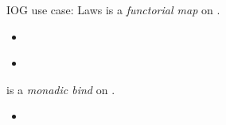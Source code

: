 \documentclass[aspectratio=169]{beamer}
\begin{document}
\begin{frame}[fragile]{IOG use case: Laws}
 is a \textit{functorial map} on .
\begin{itemize}
\item \begin{code}[inline]%
\>[0]%
\>[10]\AgdaSymbol{:}\AgdaSpace{}%
\AgdaSymbol{(}\AgdaSpace{}%
\AgdaSymbol{:}\AgdaSpace{}%
\AgdaSpace{}%
\AgdaSymbol{)}\AgdaSpace{}%
\AgdaSpace{}%
\AgdaSpace{}%
\AgdaSpace{}%
\AgdaSpace{}%
\AgdaSpace{}%
\<%
\end{code}
\item \begin{code}[inline]%
\>[0]%
\>[10]\AgdaSymbol{:}\AgdaSpace{}%
\AgdaSymbol{(}\AgdaSpace{}%
\AgdaSymbol{:}\AgdaSpace{}%
\AgdaSpace{}%
\AgdaSymbol{)}\AgdaSpace{}%
\AgdaSymbol{(}\AgdaSpace{}%
\AgdaSymbol{:}\AgdaSpace{}%
\AgdaSpace{}%
\AgdaSpace{}%
%
\>[39]\AgdaSymbol{)}\AgdaSpace{}%
\AgdaSymbol{(}\AgdaSpace{}%
\AgdaSymbol{:}\AgdaSpace{}%
\AgdaSpace{}%
\AgdaSpace{}%
\AgdaSpace{}%
\AgdaSymbol{)}\<%
\\
%
\>[10]\AgdaSpace{}%
\AgdaSpace{}%
\AgdaSymbol{(}\AgdaSpace{}%
\AgdaSpace{}%
\AgdaSymbol{)}\AgdaSpace{}%
\AgdaSpace{}%
\AgdaSpace{}%
\AgdaSpace{}%
\AgdaSpace{}%
\AgdaSymbol{(}\AgdaSpace{}%
\AgdaSpace{}%
\AgdaSymbol{)}\<%
\end{code}
\end{itemize}
\pause
{} is a \textit{monadic bind} on .
\begin{itemize}
\item \begin{code}[inline]%
\>[0]%
\>[10]\AgdaSymbol{:}\AgdaSpace{}%
\AgdaSymbol{(}\AgdaSpace{}%
\AgdaSymbol{:}\AgdaSpace{}%
\AgdaSpace{}%
\AgdaSymbol{)}\AgdaSpace{}%
\AgdaSpace{}%
\AgdaSpace{}%
\AgdaSpace{}%

\end{code}
\end{itemize}
\end{frame}
\end{document}
